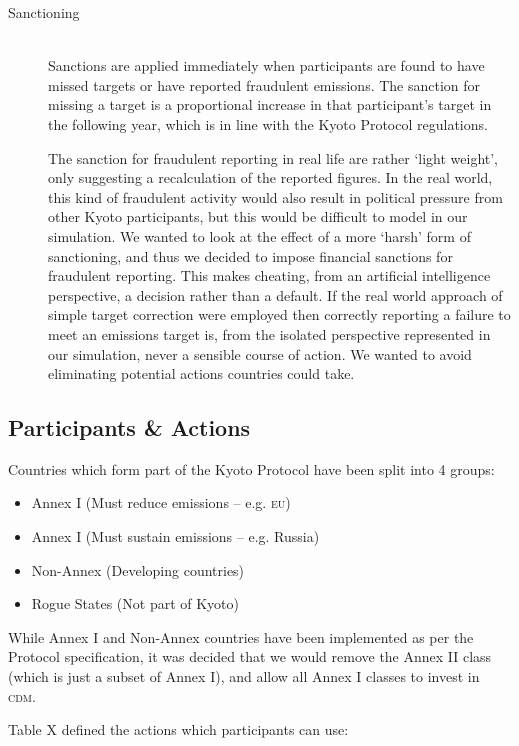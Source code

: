 \begin{description}
\item [Sanctioning] \hfill \\ 
Sanctions are applied immediately when participants are found to have missed targets or have reported fraudulent emissions. The sanction for missing a target is a proportional increase in that participant's target in the following year, which is in line with the Kyoto Protocol regulations.

The sanction for fraudulent reporting in real life are rather `light weight', only suggesting a recalculation of the reported figures. In the real world, this kind of fraudulent activity would also result in political pressure from other Kyoto participants, but this would be difficult to model in our simulation. We wanted to look at the effect of a more `harsh' form of sanctioning, and thus we decided to impose financial sanctions for fraudulent reporting. This makes cheating, from an artificial intelligence perspective, a decision rather than a default. If the real world approach of simple target correction were employed then correctly reporting a failure to meet an emissions target is, from the isolated perspective represented in our simulation, never a sensible course of action. We wanted to avoid eliminating potential actions countries could take.
\end{description}

\subsection{Participants \& Actions}
Countries which form part of the Kyoto Protocol have been split into 4 groups:

\begin{itemize}
	\item{Annex I (Must reduce emissions -- e.g. \textsc{eu})}
	\item{Annex I (Must sustain emissions -- e.g. Russia)}
	\item{Non-Annex (Developing countries)}
	\item{Rogue States (Not part of Kyoto)}
\end{itemize}

While Annex I and Non-Annex countries have been implemented as per the Protocol specification, it was decided that we would remove the Annex II class (which is just a subset of Annex I), and allow all Annex I classes to invest in \textsc{cdm}.

Table X defined the actions which participants can use:

